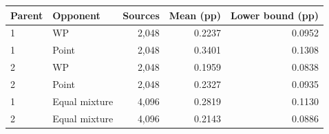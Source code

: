\begin{tabular}{llrrr}
\toprule
Parent & Opponent & Sources & Mean (pp) & Lower bound (pp) \\
\midrule
1 & WP & 2,048 & 0.2237 & 0.0952 \\
1 & Point & 2,048 & 0.3401 & 0.1308 \\
2 & WP & 2,048 & 0.1959 & 0.0838 \\
2 & Point & 2,048 & 0.2327 & 0.0935 \\
\midrule
1 & Equal mixture & 4,096 & 0.2819 & 0.1130 \\
2 & Equal mixture & 4,096 & 0.2143 & 0.0886 \\
\bottomrule
\end{tabular}
